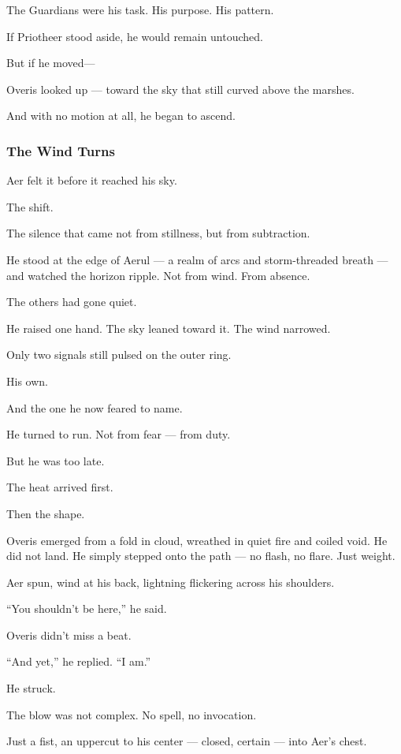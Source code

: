 \documentclass[12pt]{article}
\begin{document}
The Guardians were his task. His purpose. His pattern.

If Priotheer stood aside, he would remain untouched.

But if he moved—

Overis looked up — toward the sky that still curved above the marshes.

And with no motion at all, he began to ascend.

\dotfill

\subsubsection{The Wind Turns}

Aer felt it before it reached his sky.

The shift.

The silence that came not from stillness, but from subtraction.

He stood at the edge of Aerul — a realm of arcs and storm-threaded breath — and watched the horizon ripple. Not from wind. From absence.

The others had gone quiet.

He raised one hand. The sky leaned toward it. The wind narrowed.

Only two signals still pulsed on the outer ring.

His own.

And the one he now feared to name.

He turned to run. Not from fear — from duty.

But he was too late.

The heat arrived first.

Then the shape.

Overis emerged from a fold in cloud, wreathed in quiet fire and coiled void. He did not land. He simply stepped onto the path — no flash, no flare. Just weight.

Aer spun, wind at his back, lightning flickering across his shoulders.

``You shouldn’t be here,'' he said.

Overis didn't miss a beat.

``And yet,'' he replied. ``I am.''

He struck.

The blow was not complex. No spell, no invocation.

Just a fist, an uppercut to his center — closed, certain — into Aer’s chest.
\end{document}
